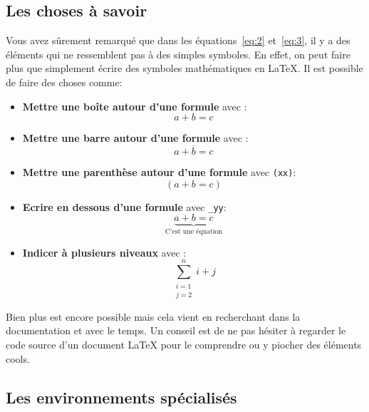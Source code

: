 \subsection{Les choses à savoir}\label{subsec:latex_math_know}

Vous avez sûrement remarqué que dans les équations~\eqref{eq:2} et~\eqref{eq:3},
il y a des éléments qui ne ressemblent pas à des simples symboles. En effet,
on peut faire plus que simplement écrire des symboles mathématiques en LaTeX.
Il est possible de faire des choses comme:
\begin{itemize}
    \item \textbf{Mettre une boîte autour d'une formule} avec \texttt{}:
    \begin{equation}
        \boxed{a + b = c}
    \end{equation}
    \item \textbf{Mettre une barre autour d'une formule} avec \texttt{}:
    \begin{equation}
        \overline{a + b = c}
    \end{equation}
    \item \textbf{Mettre une parenthèse autour d'une formule} avec \texttt{\left(xx\right)}:
    \begin{equation}
        \left( a + b = c \right)
    \end{equation}
    \item \textbf{Ecrire en dessous d'une formule} avec \texttt{_{yy}}:
    \begin{equation}
        \underbrace{a + b = c}_{\text{C'est une équation}}
    \end{equation}
    \item \textbf{Indicer à plusieurs niveaux} avec \texttt{}:
    \begin{equation}
        \sum_{\substack{i=1 \\ j=2}}^{n} i + j
    \end{equation}
\end{itemize}

Bien plus est encore possible mais cela vient en recherchant dans la documentation
et avec le temps. Un conseil est de ne pas hésiter à regarder le code source
d'un document LaTeX pour le comprendre ou y piocher des éléments cools.

\subsection{Les environnements spécialisés}\label{subsec:latex_math_env}

